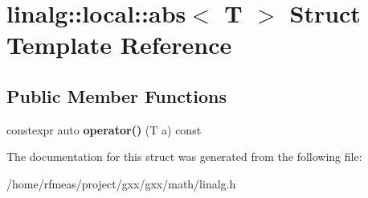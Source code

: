 \hypertarget{structlinalg_1_1local_1_1abs}{}\section{linalg\+:\+:local\+:\+:abs$<$ T $>$ Struct Template Reference}
\label{structlinalg_1_1local_1_1abs}
\subsection*{Public Member Functions}
\begin{DoxyCompactItemize}
\item 
constexpr auto {\bfseries operator()} (T a) const \hypertarget{structlinalg_1_1local_1_1abs_ad4928d8bfce4ddb32ce55f0a935ed2bf}{}\label{structlinalg_1_1local_1_1abs_ad4928d8bfce4ddb32ce55f0a935ed2bf}

\end{DoxyCompactItemize}


The documentation for this struct was generated from the following file\+:\begin{DoxyCompactItemize}
\item 
/home/rfmeas/project/gxx/gxx/math/linalg.\+h\end{DoxyCompactItemize}
